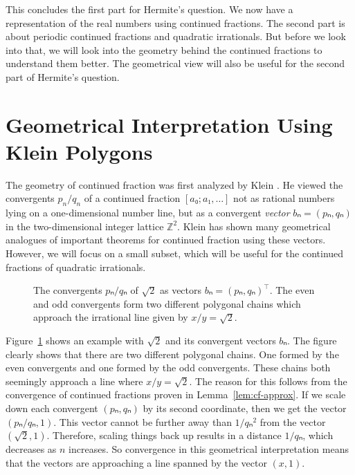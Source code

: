 This concludes the first part for Hermite's question.
We now have a representation of the real numbers using continued fractions.
The second part is about periodic continued fractions and quadratic irrationals.
But before we look into that, we will look into the geometry behind the continued fractions
to understand them better.
The geometrical view will also be useful for the second part of Hermite's question.

\section{Geometrical Interpretation Using Klein Polygons}

The geometry of continued fraction was first analyzed by Klein \cite{Klein95}.
He viewed the convergents $p_n/q_n$ of a continued fraction $[a₀; a₁, …]$ not
as rational numbers lying on a one-dimensional number line,
but as a convergent \emph{vector} $bₙ = (pₙ, qₙ)$ in the two-dimensional integer lattice $ℤ^2$.
Klein has shown many geometrical analogues of important theorems for continued fraction
using these vectors.
However, we will focus on a small subset, which will be useful for the
continued fractions of quadratic irrationals.

\begin{figure}[tb]
  \centering
  
  \caption{
    The convergents $pₙ/qₙ$ of $\sqrt{2}$ as vectors $bₙ = (pₙ, qₙ)^⊤$.
    The even and odd convergents form two different polygonal chains which
    approach the irrational line given by $x/y = \sqrt{2}$.
  }
  \label{fig:klein-polygon}
\end{figure}

Figure~\ref{fig:klein-polygon} shows an example with $\sqrt{2}$ and its convergent vectors $bₙ$.
The figure clearly shows that there are two different polygonal chains.
One formed by the even convergents and one formed by the odd convergents.
These chains both seemingly approach a line where $x/y = \sqrt{2}$.
The reason for this follows from the convergence of continued fractions proven in Lemma~\ref{lem:cf-approx}.
If we scale down each convergent $(pₙ, qₙ)$ by its second coordinate,
then we get the vector $(pₙ/qₙ, 1)$.
This vector cannot be further away than $1/qₙ^2$ from the vector $(\sqrt{2}, 1)$.
Therefore, scaling things back up results in a distance $1/qₙ$, which decreases as $n$ increases.
So convergence in this geometrical interpretation means that the vectors are
approaching a line spanned by the vector $(x, 1)$.

